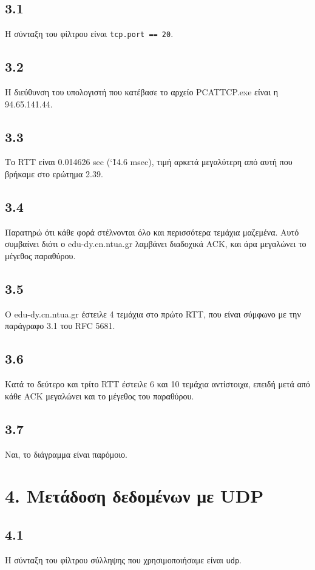 		\subsection*{3.1} 
			Η σύνταξη του φίλτρου είναι \verb|tcp.port == 20|.

		\subsection*{3.2} 
			Η διεύθυνση του υπολογιστή που κατέβασε το αρχείο PCATTCP.exe είναι η 94.65.141.44.

		\subsection*{3.3} 
			Το RTT είναι 0.014626 sec (\char`\~14.6 msec), τιμή αρκετά μεγαλύτερη από αυτή που βρήκαμε στο ερώτημα 2.39.

		\subsection*{3.4} 
			Παρατηρώ ότι κάθε φορά στέλνονται όλο και περισσότερα τεμάχια μαζεμένα. Αυτό συμβαίνει διότι ο edu-dy.cn.ntua.gr λαμβάνει διαδοχικά ACK, και άρα μεγαλώνει το μέγεθος παραθύρου.

		\subsection*{3.5} 
			Ο edu-dy.cn.ntua.gr έστειλε 4 τεμάχια στο πρώτο RTT, που είναι σύμφωνο με την παράγραφο 3.1 του RFC 5681.

		\subsection*{3.6}
			Κατά το δεύτερο και τρίτο RTT έστειλε 6 και 10 τεμάχια αντίστοιχα, επειδή μετά από κάθε ACK μεγαλώνει και το μέγεθος του παραθύρου.
		
		\subsection*{3.7}
			Ναι, το διάγραμμα είναι παρόμοιο.
	
	\section*{4. Μετάδοση δεδομένων με UDP}
		
		\subsection*{4.1}
			Η σύνταξη του φίλτρου σύλληψης που χρησιμοποιήσαμε είναι \verb|udp|.

